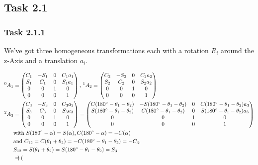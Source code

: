 \subsection*{Task 2.1}

\subsubsection*{Task 2.1.1}

We've got three homogeneous transformations each with a rotation $R_i$ around the z-Axis and a translation $a_i$.

\begin{align*}
^0A_1 &= 
\begin{pmatrix}
C_1 & -S_1 & 0 & C_1a_1 \\
S_1 & C_1 & 0 & S_1a_1 \\
0 & 0 & 1 & 0 \\
0 & 0 & 0 & 1 
\end{pmatrix},
\,^1A_2 = 
\begin{pmatrix}
C_2 & -S_2 & 0 & C_2a_2 \\
S_2 & C_2 & 0 & S_2a_2 \\
0 & 0 & 1 & 0 \\
0 & 0 & 0 & 1 
\end{pmatrix} \\
^2A_3 &= 
\begin{pmatrix}
C_3 & -S_3 & 0 & C_3a_3 \\
S_3 & C_3 & 0 & S_3a_3 \\
0 & 0 & 1 & 0 \\
0 & 0 & 0 & 1 
\end{pmatrix}
=
\begin{pmatrix}
C(180\degree-\theta_1-\theta_2) & -S(180\degree-\theta_1-\theta_2) & 0 & C(180\degree-\theta_1-\theta_2)a_3 \\
S(180\degree-\theta_1-\theta_2) & C(180\degree-\theta_1-\theta_2) & 0 & S(180\degree-\theta_1-\theta_2)a_3 \\
0 & 0 & 1 & 0 \\
0 & 0 & 0 & 1 
\end{pmatrix} \\
&\text{with } S(180\degree-\alpha) = S(\alpha), C(180\degree-\alpha) = -C(\alpha)\\
& \text{and } C_{12} = C(\theta_1+\theta_2) = -C(180\degree-\theta_1-\theta_2) = -C_3,\\
& S_{12} = S(\theta_1+\theta_2) = S(180\degree-\theta_1-\theta_2) = S_3\\
&=
\begin{pmatrix}

\end{pmatrix}
\end{align*}
